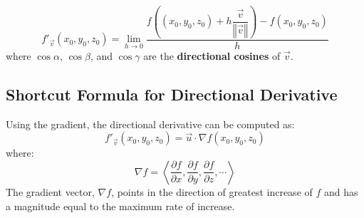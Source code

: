 \documentclass[a4paper,12pt,openany]{book}
\newcommand{\magn}[1]{
    \left\Vert#1\right\Vert
}
\begin{document}
\begin{equation}\label{Directional Derivative at a Point Definition}
    f'_{\vec{v}}(x_0, y_0, z_0) = 
    \lim_{h \to 0}
    \dfrac{
        f((x_0, y_0, z_0) + h\dfrac{\vec{v}}{\magn{\vec{v}}}) - f(x_0, y_0, z_0)
    }{h}
\end{equation}
where \(\cos \alpha\), \(\cos \beta\), and \(\cos \gamma\) are the \textbf{directional cosines} of \(\vec{v}\).

\subsection{Shortcut Formula for Directional Derivative}
Using the gradient, the directional derivative can be computed as:
\begin{equation}\label{Directional Derivative Shortcut}
    f'_{\vec{v}}(x_0, y_0, z_0) = \vec{u} \cdot \nabla f(x_0, y_0, z_0)
\end{equation}
where:
\begin{equation}\label{Gradient Definition}
    \nabla f = \left\langle \dfrac{\partial f}{\partial x}, \dfrac{\partial f}{\partial y}, \dfrac{\partial f}{\partial z}, \cdots \right\rangle
\end{equation}
The gradient vector, \(\nabla f\), points in the direction of greatest increase of \(f\) and has a magnitude equal to the maximum rate of increase.
\end{document}
